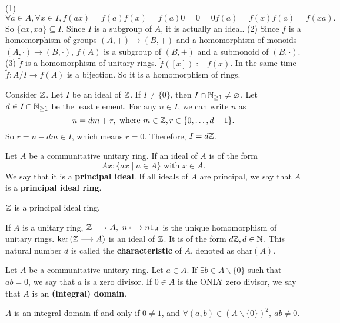 \documentclass{book}
\numberwithin{equation}{section}
\begin{document}
\begin{proofenv}
    \quad \newline
    (1) $$\forall a\in A,\forall x\in I, f(ax)=f(a)f(x)=f(a)0=0=0f(a)=f(x)f(a)=f(xa).$$
    So $\{ax,xa\}\subseteq I$. Since $I$ is a subgroup of $A$, it is actually an ideal.
    \newline
    (2) Since $f$ is a homomorphism of groups $(A,+)\longrightarrow(B,+)$ and a homomorphism of monoids $(A,\cdot)\longrightarrow(B,\cdot)$, $f(A)$ is a subgroup of $(B,+)$ and a submonoid of $(B,\cdot)$.
    \newline
    (3) $\tilde{f}$ is a homomorphism of unitary rings. $\tilde{f}([x]):=f(x)$. In the same time $\tilde{f}:A/I\longrightarrow f(A)$ is a bijection. So it is a homomorphism of rings.
\end{proofenv}
\begin{exampleenv}
    Consider $\mathbb{Z}$. Let $I$ be an ideal of $\mathbb{Z}$. If $I\not=\{0\}$, then $I\cap\mathbb{N}_{\ge1}\not=\varnothing$. Let $d\in I\cap\mathbb{N}_{\ge1}$ be the least element. For any $n\in I$, we can write $n$ as 
    $$n=dm+r,\text{ where }m\in\mathbb{Z},r\in \{0,\dots,d-1\}.$$
    So $r=n-dm\in I$, which means $r=0$. Therefore, $I=d\mathbb{Z}$.
\end{exampleenv}
\begin{definitionenv}
    Let $A$ be a communitative unitary ring. If an ideal of $A$ is of the form 
    $$Ax:\{ax\mid a\in A\}\text{ with }x\in A.$$
    We say that it is a \textbf{principal ideal}. If all ideals of $A$ are principal, we say that $A$ is a \textbf{principal ideal ring}. 
\end{definitionenv}
\begin{exampleenv}
    $\mathbb{Z}$ is a principal ideal ring.
\end{exampleenv}
\begin{remark}
    If $A$ is a unitary ring, $\ZZ\longrightarrow A,\ n\longmapsto n1_A$ is the unique homomorphism of unitary rings. $\ker\left(\mathbb{Z}\longrightarrow A\right)$ is an ideal of $\mathbb{Z}$. It is of the form $d\mathbb{Z},d\in \mathbb{N}$. This natural number $d$ is called the \textbf{characteristic} of $A$, denoted as $\mathrm{char}(A)$.
\end{remark}
\begin{definitionenv}
    Let $A$ be a communitative unitary ring. Let $a\in A$. If $\exists b\in A\backslash\{0\}$ such that $ab=0$, we say that $a$ is a zero divisor. If $0\in A$ is the ONLY zero divisor, we say that $A$ is an \textbf{(integral) domain}.
\end{definitionenv}
\begin{box2}
    $A$ is an integral domain if and only if $0\not=1$, and $\forall(a,b)\in \left(A\backslash\{0\}\right)^2,\ ab\not=0$.
\end{box2}
\end{document}
